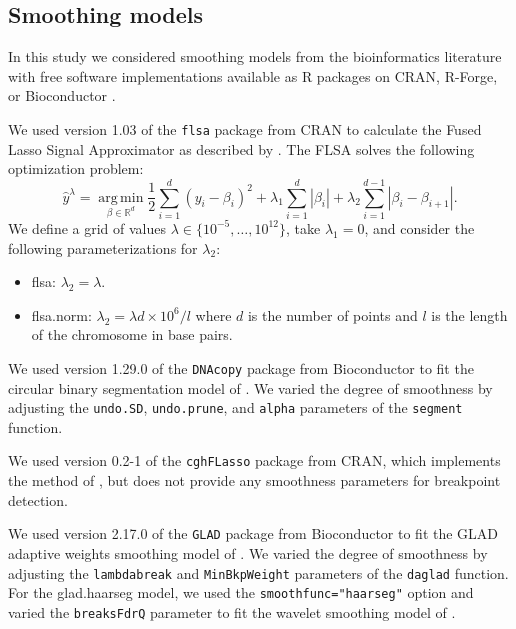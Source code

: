 \documentclass{bioinfo}
\newcommand{\argmin}{\operatorname*{arg\, min}}
\newcommand{\model}[1]{#1}
\newcommand{\code}[1]{\texttt{#1}}
\newcommand{\package}[1]{\texttt{#1}}
\newcommand{\RR}{\mathbb R}
\begin{document}
\begin{methods}
\subsection{Smoothing models}\label{models}

In this study we considered smoothing models from the bioinformatics
literature with free software implementations available as R packages
on CRAN, R-Forge, or Bioconductor \citep{R,R-Forge,Bioconductor}.



We used version 1.03 of the \package{flsa} package from CRAN to
calculate the Fused Lasso Signal Approximator as described by
\cite{fused-lasso-path}. The FLSA solves the following optimization
problem:
\begin{equation}
  \label{eq:flsa}
  \hat y^\lambda = 
\argmin_{\beta\in\RR^d} 
\frac 1 2 \sum_{i=1}^d (y_i-\beta_i)^2
+\lambda_1\sum_{i=1}^d|\beta_i|
+\lambda_2\sum_{i=1}^{d-1}|\beta_i-\beta_{i+1}|.
\end{equation}
We define a grid of values $\lambda\in\{10^{-5},\dots,10^{12}\}$, take
$\lambda_1=0$, and consider the following parameterizations for
$\lambda_2$:
\begin{itemize}
\item \model{flsa}: $\lambda_2=\lambda$.
\item \model{flsa.norm}: $\lambda_2=\lambda d \times 10^6/l$ where
  $d$ is the number of points and $l$ is the length of the chromosome
  in base pairs.
\end{itemize}


We used version 1.29.0 of the \package{DNAcopy} package from
Bioconductor to fit the circular binary segmentation model of
\cite{dnacopy}. We varied the degree of smoothness by adjusting the
\code{undo.SD}, \code{undo.prune}, and \code{alpha} parameters of the
\code{segment} function.

We used version 0.2-1 of the \package{cghFLasso} package from CRAN,
which implements the method of \cite{cghFLasso}, but does not provide
any smoothness parameters for breakpoint detection.

We used version 2.17.0 of the \package{GLAD} package from Bioconductor
to fit the GLAD adaptive weights smoothing model of \cite{glad}. We
varied the degree of smoothness by adjusting the \code{lambdabreak}
and \code{MinBkpWeight} parameters of the \code{daglad} function. For
the \model{glad.haarseg} model, we used the
\code{smoothfunc="haarseg"} option and varied the \texttt{breaksFdrQ}
parameter to fit the wavelet smoothing model of \cite{haarseg}.


\end{methods}
\end{document}
